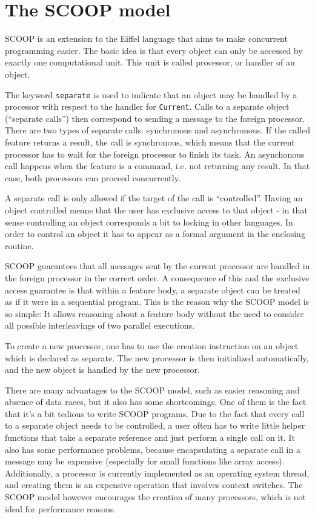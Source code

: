 \documentclass[a4paper,10pt]{report}
\begin{document}


\section {The SCOOP model}

SCOOP is an extension to the Eiffel language  that aims to make concurrent programming easier.
The basic idea is that every object can only be accessed by exactly one computational unit.
This unit is called processor, or handler of an object.

The keyword \lstinline!separate! is used to indicate that an object may be handled by a processor with respect to the handler for \lstinline!Current!.
Calls to a separate object (``separate calls'') then correspond to sending a message to the foreign processor.
There are two types of separate calls: synchronous and asynchronous.
If the called feature returns a result, the call is synchronous, which means that the current processor has to wait for the foreign processor to finish its task.
An asynchonous call happens when the feature is a command, i.e. not returning any result.
In that case, both processors can proceed concurrently.

A separate call is only allowed if the target of the call is ``controlled''.
Having an object controlled means that the user has exclusive access to that object - in that sense controlling an object corresponds a bit to locking in other languages.
In order to control an object it has to appear as a formal argument in the enclosing routine.

SCOOP guarantees that all messages sent by the current processor are handled in the foreign processor in the correct order.
A consequence of this and the exclusive access guarantee is that within a feature body, a separate object can be treated as if it were in a sequential program.
This is the reason why the SCOOP model is so simple: 
It allows reasoning about a feature body without the need to consider all possible interleavings of two parallel executions.

To create a new processor, one has to use the creation instruction on an object which is declared as separate.
The new processor is then initialized automatically, and the new object is handled by the new processor.

There are many advantages to the SCOOP model, such as easier reasoning and absence of data races, but it also has some shortcomings.
One of them is the fact that it's a bit tedious to write SCOOP programs.
Due to the fact that every call to a separate object needs to be controlled, a user often has to write little helper functions that take a separate reference and just perform a single call on it.
It also has some performance problems, because encapsulating a separate call in a message may be expensive (especially for small functions like array access).
Additionally, a processor is currently implemented as an operating system thread, and creating them is an expensive operation that involves context switches.
The SCOOP model however encourages the creation of many processors, which is not ideal for performance reasons.
\end{document}
